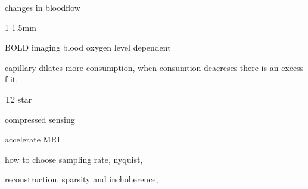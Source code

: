 changes in bloodflow

1-1.5mm

BOLD imaging blood oxygen level dependent

capillary dilates more consumption, when consumtion deacreses there is an excess f it.

T2 star

compressed sensing

accelerate MRI

how to choose sampling rate, nyquist, 

reconstruction, sparsity and inchoherence,  